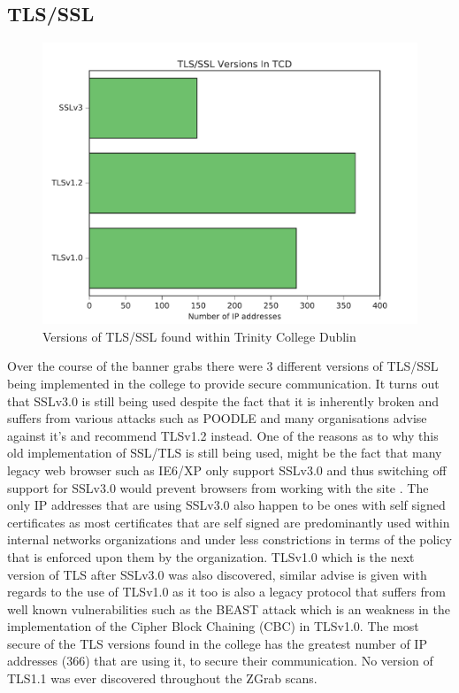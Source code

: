 \documentclass[a4wide,leqno,12pt]{report}
\begin{document}
\subsection{TLS/SSL}
\begin{figure}[H]
\centering
\includegraphics[scale=.5]{pdf_images/TLSVersionsInTCD}
\caption{Versions of TLS/SSL found within Trinity College Dublin}
\label{fig:TLS_SSL}
\end{figure}

Over the course of the banner grabs there were 3 different versions of TLS/SSL being implemented in the college to provide secure communication. It turns out that SSLv3.0 is still being used despite the fact that it is inherently broken and suffers from various attacks such as POODLE\cite{holz2015summarizing} \cite{moller2014poodle} and many organisations \cite{ssllabs} advise against it's and recommend  TLSv1.2 instead. One of the reasons as to why this old implementation of SSL/TLS is still being used, might be the fact that many legacy web browser such as IE6/XP only support SSLv3.0 and thus switching off support for SSLv3.0 would prevent browsers from working with the site \cite{owaspTLS_SSL}. The only IP addresses that are using SSLv3.0 also happen to be ones with self signed certificates as most certificates that are self signed are predominantly  used within internal networks organizations and under less constrictions in terms of the policy that is enforced upon them by the organization. TLSv1.0 which is the next version of TLS after SSLv3.0 was also discovered, similar advise is given with regards to the use of TLSv1.0 as it too is also a legacy protocol that suffers from well known vulnerabilities such as the BEAST attack\cite{holz2015summarizing} which is an weakness in the implementation of the Cipher Block Chaining (CBC) in TLSv1.0. The most secure of the TLS versions found in the college has the greatest number of IP addresses (366) that are using it, to secure their communication. No version of TLS1.1 was ever discovered throughout the ZGrab scans.
\end{document}

